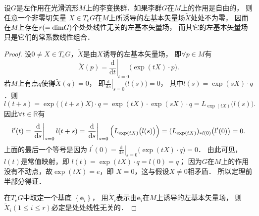 \begin{theorem}\label{chlg:thm_Liefga}
    设$G$是左作用在光滑流形$M$上的李变换群．如果李群$G$在$M$上的作用是自由的，
    则任意一个非零切矢量 $X \in T_e G$在$M$上所诱导的左基本矢量场$\widetilde{X}$处处不为零，
    因而在$M$上存在$r(={\rm dim} G)$个处处线性无关的左基本矢量场，
    而其它的左基本矢量场只是它们的常系数线性组合．
\end{theorem} 
\begin{proof}  
    设$0 \neq X \in T_e G$，$\widetilde{X}$是由$X$诱导的左基本矢量场，
    即$\forall p \in M$有
    \begin{equation}
        \widetilde{X}(p)=\left.\frac{\mathrm{d}}{\mathrm{d} t}\right|_{t=0}\bigl(\exp (t X)\cdot p\bigr) .
    \end{equation}
    若$M$上有点$q$使得$\widetilde{X}(q)=0$，
    即$\left.\frac{\mathrm{d}}{\mathrm{d} s}\right|_{s=0}\bigl(l(s) \bigr)=0$，
    其中$l(s)=\exp (s X)\cdot q$．则
    \begin{equation*}
        l(t+s)=\exp \bigl((t+s) X\bigr)\cdot q
        =\exp (t X) \cdot \exp (s X) \cdot q =L_{\exp (t X)}\bigl(l(s)\bigr) .
    \end{equation*}
    因此$\forall t \in \mathbb{R}$有
    \begin{equation*}
        l^{\prime}(t) =\left.\frac{\mathrm{d}}{\mathrm{d} s}\right|_{s=0} l(t+s)
        =\left.\frac{\mathrm{d}}{\mathrm{d} s}\right|_{s=0}\Bigl(L_{\exp (t X)}\bigl(l(s)\bigr)\Bigr) 
        =(L_{\exp (t X)})_{* l(0)}\bigl(l^{\prime}(0)\bigr)=0 .
    \end{equation*}
    上面的最后一个等号是因为
    $l^{\prime}(0)=\left.\frac{\mathrm{d}}{\mathrm{d} s}\right|_{s=0}\bigl(\exp (t X)\cdot q\bigr)=0$．
    由此可见，$l(t)$是常值映射，即
    $l(t)=\exp (t X)\cdot q=l(0)=q $；
    因为$G$在$M$上的作用没有不动点，故$\exp (t X)=e$，即 $X=0$，这与假设$X \neq 0$相矛盾．
    所以定理前半部分得证．
    
    在$T_e G$中取定一个基底 $\left\{\boldsymbol{e}_i\right\}$，
    用$\widetilde{X}_i$表示由$\boldsymbol{e}_i$在$M$上诱导的左基本矢量场，
    则$\widetilde{X}_i (1 \leqslant i \leqslant r)$必定是处处线性无关的．
\end{proof}





